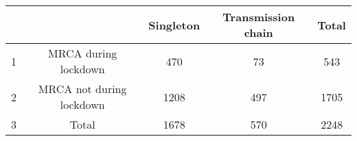 \begin{tabular}{lcccc}
  \hline
 &  & Singleton & Transmission chain & Total \\ 
  \hline
1 & MRCA during lockdown & 470 &  73 & 543 \\ 
  2 & MRCA not during lockdown & 1208 & 497 & 1705 \\ 
  3 & Total & 1678 & 570 & 2248 \\ 
   \hline
\end{tabular}
